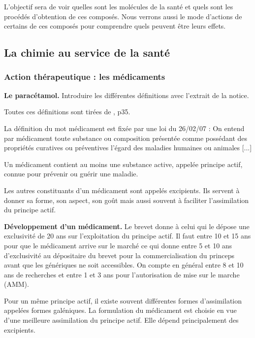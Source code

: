 L'objectif sera de voir quelles sont les molécules de la santé et quels sont les procédés d'obtention de ces composés.
Nous verrons aussi le mode d'actions de certains de ces composés pour comprendre quels peuvent être leurs effets.

\subsection{La chimie au service de la santé}

\subsubsection{Action thérapeutique : les médicaments}

\begin{slide}
\textbf{Le paracétamol.}
Introduire les différentes définitions avec l'extrait de la notice.
\end{slide}

Toutes ces définitions sont tirées de \cite{Prevost2017}, p35.

La définition du mot médicament est fixée par une loi du 26/02/07 : \og On entend par médicament toute substance ou composition présentée comme possédant des propriétés curatives ou préventives l'égard des maladies humaines ou animales [...] \fg{}

Un médicament contient au moins une substance active, appelée principe actif, connue pour prévenir ou guérir une maladie.

Les autres constituants d'un médicament sont appelés excipients.
Ils servent à donner sa forme, son aspect, son goût mais aussi souvent à faciliter l'assimilation du principe actif.

\begin{slide}
\textbf{Développement d'un médicament.}
Le brevet donne à celui qui le dépose une exclusivité de 20 ans sur l'exploitation du principe actif.
Il faut entre 10 et 15 ans pour que le médicament arrive sur le marché ce qui donne entre 5 et 10 ans d'exclusivité au dépositaire du brevet pour la commercialisation du princeps avant que les génériques ne soit accessibles.
On compte en général entre 8 et 10 ans de recherches et entre 1 et 3 ans pour l'autorisation de mise sur le marche (AMM).
\end{slide}

Pour un même principe actif, il existe souvent différentes formes d'assimilation appelées formes galéniques.
La formulation du médicament est choisie en vue d'une meilleure assimilation du principe actif.
Elle dépend principalement des excipients.

